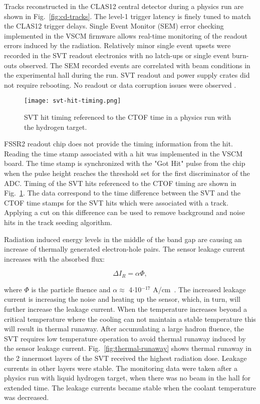 Tracks reconstructed in the CLAS12 central detector during a physics run are shown in Fig.~\ref{fig:cd-tracks}. The level-1 trigger latency is finely tuned to match the CLAS12 trigger delays. Single Event Monitor (SEM) error checking implemented in the VSCM firmware allows real-time monitoring of the readout errors induced by the radiation. Relatively minor single event upsets were recorded in the SVT readout electronics with no latch-ups or single event burn-outs observed. The SEM recorded events are correlated with beam conditions in the experimental hall during the run. SVT readout and power supply crates did not require rebooting. No readout or data corruption issues were observed \cite{SEENOTE}. 

\begin{figure}[htb] 
\centering 
\texttt{[image: svt-hit-timing.png]}
\caption{SVT hit timing referenced to the CTOF time in a physics run with the hydrogen target.}
\label{fig:svt-hit-timing}
\end{figure}

FSSR2 readout chip does not provide the timing information from the hit. Reading the time stamp associated with a hit was implemented in the VSCM board. The time stamp is synchronized with the "Got Hit" pulse from the chip when the pulse height reaches the threshold set for the first discriminator of the ADC. Timing of the SVT hits referenced to the CTOF timing are shown in Fig.~\ref{fig:svt-hit-timing}. The data correspond to the time difference between the SVT and the CTOF time stamps for the SVT hits which were associated with a track. Applying a cut on this difference can be  used to remove background and noise hits in the track seeding algorithm.

Radiation induced energy levels in the middle of the band gap are causing an increase of thermally generated electron-hole pairs. The sensor leakage current increases with the absorbed flux:

\begin{equation} \Delta I_R = \alpha \Phi \label{eq:leakage-fluence},
\end{equation}

where $\Phi$ is the particle fluence and $\alpha \approx$ 4$\cdot$10$^{-17}$ A/cm~\cite{DIERLAMMTHESIS}. The increased leakage current is increasing the noise and heating up the sensor, which, in turn, will further increase the leakage current. When the temperature increases beyond a critical temperature where the cooling can not maintain a stable temperature this will result in thermal runaway. After accumulating a large hadron fluence, the SVT requires low temperature operation to avoid thermal runaway induced by the sensor leakage current. Fig.~\ref{fig:thermal-runaway} shows thermal runaway in the 2 innermost layers of the SVT received the highest radiation dose. Leakage currents in other layers were stable. The monitoring data were taken after a physics run with liquid hydrogen target, when there was no beam in the hall for extended time. The leakage currents became stable when the coolant temperature was decreased.

